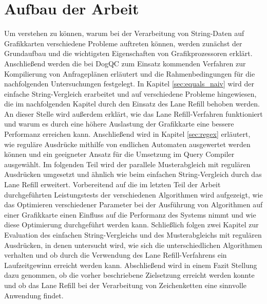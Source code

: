 \section{Aufbau der Arbeit}

Um verstehen zu können, warum bei der Verarbeitung von String-Daten auf Grafikkarten verschiedene Probleme auftreten können, werden zunächst der Grundaufbau und die wichtigsten Eigenschaften von Grafikprozessoren erklärt.
Anschließend werden die bei DogQC zum Einsatz kommenden Verfahren zur Kompilierung von Anfrageplänen erläutert und die Rahmenbedingungen für die nachfolgenden Untersuchungen festgelegt.
In Kapitel \ref{sec:equals_naiv} wird der einfache String-Vergleich erarbeitet und auf verschiedene Probleme hingewiesen, die im nachfolgenden Kapitel durch den Einsatz des Lane Refill behoben werden.
An dieser Stelle wird außerdem erklärt, wie das Lane Refill-Verfahren funktioniert und warum es durch eine höhere Auslastung der Grafikkarte eine bessere Performanz erreichen kann.
Anschließend wird in Kapitel \ref{sec:regex} erläutert, wie reguläre Ausdrücke mithilfe von endlichen Automaten ausgewertet werden können und ein geeigneter Ansatz für die Umsetzung im Query Compiler ausgewählt.
Im folgenden Teil wird der parallele Musterabgleich mit regulären Ausdrücken umgesetzt und ähnlich wie beim einfachen String-Vergleich durch das Lane Refill erweitert.
Vorbereitend auf die im letzten Teil der Arbeit durchgeführten Leistungstests der verschiedenen Algorithmen wird aufgezeigt, wie das Optimieren verschiedener Parameter bei der Ausführung von Algorithmen auf einer Grafikkarte einen Einfluss auf die Performanz des Systems nimmt und wie diese Optimierung durchgeführt werden kann.
Schließlich folgen zwei Kapitel zur Evaluation des einfachen String-Vergleichs und des Musterabgleichs mit regulären Ausdrücken, in denen untersucht wird, wie sich die unterschiedlichen Algorithmen verhalten und ob durch die Verwendung des Lane Refill-Verfahrens ein Laufzeitgewinn erreicht werden kann.
Abschließend wird in einem Fazit Stellung dazu genommen, ob die vorher beschriebene Zielsetzung erreicht werden konnte und ob das Lane Refill bei der Verarbeitung von Zeichenketten eine sinnvolle Anwendung findet.